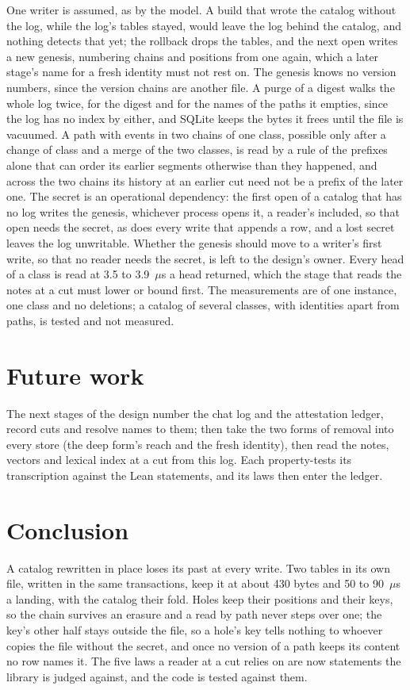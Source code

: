 \documentclass[11pt]{article}
\theoremstyle{plain}
\theoremstyle{definition}
\begin{document}
One writer is assumed, as by the model. A build that wrote the catalog without the log, while the
log's tables stayed, would leave the log behind the catalog, and nothing detects that yet; the
rollback drops the tables, and the next open writes a new genesis, numbering chains and positions
from one again, which a later stage's name for a fresh identity must not rest on. The genesis
knows no version numbers, since the version chains are another file. A purge of a digest walks
the whole log twice, for the digest and for the names of the paths it empties, since the log has
no index by either, and SQLite keeps the bytes it frees until the file is vacuumed. A path with
events in two chains of one class, possible only after a change of class and a merge of the two
classes, is read by a rule of the prefixes alone that can order its earlier segments otherwise
than they happened, and across the two chains its history at an earlier cut need not be a prefix
of the later one. The secret is an operational dependency: the first open of a catalog that has no
log writes the genesis, whichever process opens it, a reader's included, so that open needs the
secret, as does every write that appends a row, and a lost secret leaves the log unwritable.
Whether the genesis should move to a writer's first write, so that no reader needs the secret, is
left to the design's owner. Every head of a class is read at 3.5 to 3.9~$\mu$s a head returned,
which the stage that reads the notes at a cut must lower or bound first. The measurements are of
one instance, one class and no deletions; a catalog of several classes, with identities apart from
paths, is tested and not measured.

\section{Future work}

The next stages of the design number the chat log and the attestation ledger, record cuts and
resolve names to them; then take the two forms of removal into every store (the deep form's reach
and the fresh identity), then read the notes, vectors and lexical index at a cut from this log.
Each property-tests its transcription against the Lean statements, and its laws then enter the
ledger.

\section{Conclusion}

A catalog rewritten in place loses its past at every write. Two tables in its own file, written in
the same transactions, keep it at about 430 bytes and 50 to 90~$\mu$s a landing, with the
catalog their fold. Holes keep their positions and their keys, so the chain survives an erasure
and a read by path never steps over one; the key's other half stays outside the file, so a hole's
key tells nothing to whoever copies the file without the secret, and once no version of a path
keeps its content no row names it. The five laws a reader at a cut relies on are now statements
the library is judged against, and the code is tested against them.



\end{document}
